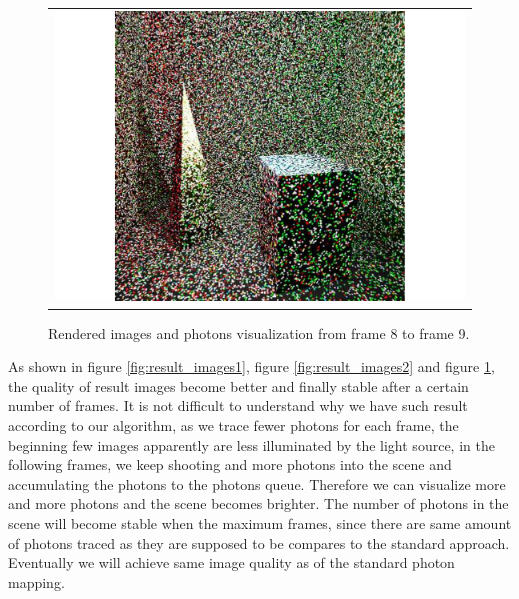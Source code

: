 \begin{figure}
\begin{center}
{\begin{tabular}{c}
\includegraphics*[scale=0.2]{imgs/pqv_frame9.pdf}
\end{tabular}
}%
\renewcommand{\thefigure}{\thechapter.\arabic{figure}}
\caption[Rendered images and photons visualization from frame 8 to frame 9]{Rendered images and photons visualization from frame 8 to frame 9.}
\label{fig:result_images3}
\end{center}
\end{figure}

As shown in figure \ref{fig:result_images1}, figure \ref{fig:result_images2} and figure \ref{fig:result_images3}, the quality of 	result images become better and finally stable after a certain number of frames. It is not difficult to understand why we have such result according to our algorithm, as we trace fewer photons for each frame, the beginning few images apparently are less illuminated by the light source, in the following frames, we keep shooting and more photons into the scene and accumulating the photons to the photons queue. Therefore we can visualize more and more photons and the scene becomes brighter. The number of photons in the scene will become stable when the maximum frames, since there are same amount of photons traced as they are supposed to be compares to the standard approach. Eventually we will achieve same image quality as of the standard photon mapping.



